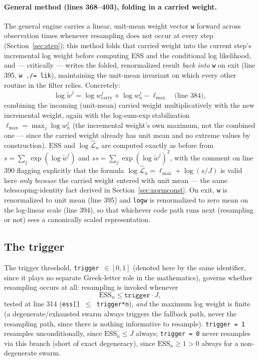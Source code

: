 \documentclass[11pt]{article}
\newcommand{\ESS}{\mathrm{ESS}}
\begin{document}
\paragraph{General method (lines 368--403), folding in a carried weight.}
The general engine carries a linear, unit-mean weight vector \texttt{w}
forward across observation times whenever resampling does not occur at every
step (Section~\ref{sec:step}); this method folds that carried weight into
the current step's incremental log weight before computing ESS and the
conditional log likelihood, and — critically — writes the folded, renormalized
result \emph{back into} \texttt{w} on exit (line 395,
\texttt{w ./= lik}), maintaining the unit-mean invariant on which every
other routine in the filter relies. Concretely:
\[
\log \tilde w^j = \log w_{\mathrm{carry}}^j + \log w_n^j - \ell_{\max}
\quad\text{(line 384)},
\]
combining the incoming (unit-mean) carried weight multiplicatively with the
new incremental weight, again with the log-sum-exp stabilization
$\ell_{\max}=\max_j \log w_n^j$ (the incremental weight's own maximum, not
the combined one — since the carried weight already has unit mean and no
extreme values by construction). $\ESS$ and $\log\widehat{\mathcal L}_n$ are
computed exactly as before from $s=\sum_j \exp(\log\tilde w^j)$ and
$ss=\sum_j \exp(\log\tilde w^j)^2$, with the comment on line 390 flagging
explicitly that the formula $\log\widehat{\mathcal L}_n = \ell_{\max}+\log(s/J)$
is valid here \emph{only because} the carried weight entered with unit mean —
the same telescoping-identity fact derived in
Section~\ref{sec:normconst}. On exit, \texttt{w} is renormalized to unit mean
(line 395) and \texttt{logw} is renormalized to zero mean on the log-linear
scale (line 394), so that whichever code path runs next (resampling or not)
sees a canonically scaled representation.

\subsection{The trigger}

The trigger threshold, \texttt{trigger}~$\in[0,1]$ (denoted here by the same
identifier, since it plays no separate Greek-letter role in the mathematics),
governs whether resampling occurs at all: resampling is invoked whenever
\[
\ESS_n \le \texttt{trigger}\cdot J,
\]
tested at line 314 (\texttt{ess[] \(\le\) trigger*n}), \emph{and} the maximum
log weight is finite (a degenerate/exhausted swarm always triggers the
fallback path, never the resampling path, since there is nothing informative
to resample). \texttt{trigger = 1} resamples unconditionally, since
$\ESS_n\le J$ always; \texttt{trigger = 0} never resamples via this branch
(short of exact degeneracy), since $\ESS_n \ge 1 > 0$ always for a
non-degenerate swarm.
\end{document}
